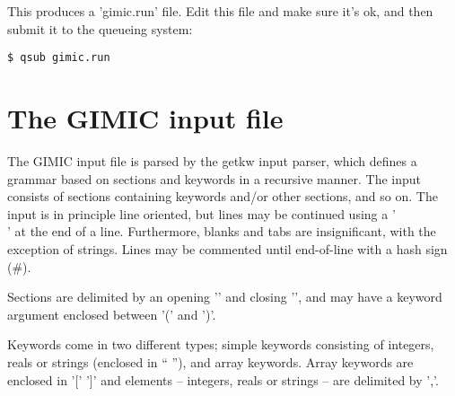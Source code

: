 \documentclass[a4paper,11pt]{article}
\begin{document}
This produces a 'gimic.run' file. Edit this file and make sure it's ok, and
then submit it to the queueing system:
\begin{verbatim}
$ qsub gimic.run
\end{verbatim}

\section{The GIMIC input file}
The GIMIC input file is parsed by the getkw input parser, which defines a
grammar based on sections and keywords in a recursive manner. The input
consists of sections containing keywords and/or other sections, and so on. The
input is in principle line oriented, but lines may be continued using a '\\'
at the end of a line. Furthermore, blanks and tabs are insignificant, with the
exception of strings. Lines may be commented until end-of-line with a hash
sign (\#).

Sections are delimited by an opening '{' and closing '}', and may have a
keyword argument enclosed between '(' and ')'.

Keywords come in two different types; simple keywords consisting of integers,
reals or strings (enclosed in `` ''), and array keywords. Array keywords are
enclosed in '[' ']' and elements -- integers, reals or strings -- are delimited 
by ','.
\end{document}
